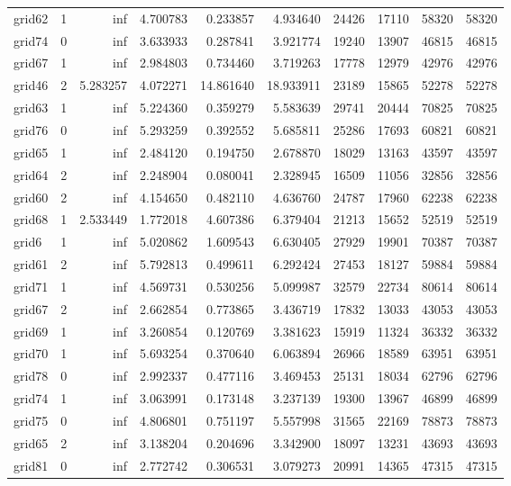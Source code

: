 \begin{longtable}{|l|r|r|r|r|r|r|r|r|r|}
grid62 & 1 & inf & 4.700783 & 0.233857 & 4.934640 & 24426 & 17110 & 58320 & 58320 \\
grid74 & 0 & inf & 3.633933 & 0.287841 & 3.921774 & 19240 & 13907 & 46815 & 46815 \\
grid67 & 1 & inf & 2.984803 & 0.734460 & 3.719263 & 17778 & 12979 & 42976 & 42976 \\
grid46 & 2 & 5.283257 & 4.072271 & 14.861640 & 18.933911 & 23189 & 15865 & 52278 & 52278 \\
grid63 & 1 & inf & 5.224360 & 0.359279 & 5.583639 & 29741 & 20444 & 70825 & 70825 \\
grid76 & 0 & inf & 5.293259 & 0.392552 & 5.685811 & 25286 & 17693 & 60821 & 60821 \\
grid65 & 1 & inf & 2.484120 & 0.194750 & 2.678870 & 18029 & 13163 & 43597 & 43597 \\
grid64 & 2 & inf & 2.248904 & 0.080041 & 2.328945 & 16509 & 11056 & 32856 & 32856 \\
grid60 & 2 & inf & 4.154650 & 0.482110 & 4.636760 & 24787 & 17960 & 62238 & 62238 \\
grid68 & 1 & 2.533449 & 1.772018 & 4.607386 & 6.379404 & 21213 & 15652 & 52519 & 52519 \\
grid6 & 1 & inf & 5.020862 & 1.609543 & 6.630405 & 27929 & 19901 & 70387 & 70387 \\
grid61 & 2 & inf & 5.792813 & 0.499611 & 6.292424 & 27453 & 18127 & 59884 & 59884 \\
grid71 & 1 & inf & 4.569731 & 0.530256 & 5.099987 & 32579 & 22734 & 80614 & 80614 \\
grid67 & 2 & inf & 2.662854 & 0.773865 & 3.436719 & 17832 & 13033 & 43053 & 43053 \\
grid69 & 1 & inf & 3.260854 & 0.120769 & 3.381623 & 15919 & 11324 & 36332 & 36332 \\
grid70 & 1 & inf & 5.693254 & 0.370640 & 6.063894 & 26966 & 18589 & 63951 & 63951 \\
grid78 & 0 & inf & 2.992337 & 0.477116 & 3.469453 & 25131 & 18034 & 62796 & 62796 \\
grid74 & 1 & inf & 3.063991 & 0.173148 & 3.237139 & 19300 & 13967 & 46899 & 46899 \\
grid75 & 0 & inf & 4.806801 & 0.751197 & 5.557998 & 31565 & 22169 & 78873 & 78873 \\
grid65 & 2 & inf & 3.138204 & 0.204696 & 3.342900 & 18097 & 13231 & 43693 & 43693 \\
grid81 & 0 & inf & 2.772742 & 0.306531 & 3.079273 & 20991 & 14365 & 47315 & 47315 \\

\end{longtable}
